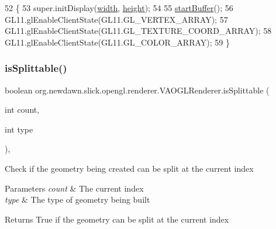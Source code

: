 \begin{DoxyCode}
52                                                    \{
53         super.initDisplay(\mbox{\hyperlink{classorg_1_1newdawn_1_1slick_1_1opengl_1_1renderer_1_1_immediate_mode_o_g_l_renderer_a65d0a04d747368ea954f69074d9102d6}{width}}, \mbox{\hyperlink{classorg_1_1newdawn_1_1slick_1_1opengl_1_1renderer_1_1_immediate_mode_o_g_l_renderer_aec68994a0ee3b7b478122af823c8a8d7}{height}});
54         
55         \mbox{\hyperlink{classorg_1_1newdawn_1_1slick_1_1opengl_1_1renderer_1_1_v_a_o_g_l_renderer_aec6f5ba886a3a750c3cc27527e7b6b6e}{startBuffer}}();
56         GL11.glEnableClientState(GL11.GL\_VERTEX\_ARRAY);
57         GL11.glEnableClientState(GL11.GL\_TEXTURE\_COORD\_ARRAY);
58         GL11.glEnableClientState(GL11.GL\_COLOR\_ARRAY);
59     \}
\end{DoxyCode}
\mbox{\label{classorg_1_1newdawn_1_1slick_1_1opengl_1_1renderer_1_1_v_a_o_g_l_renderer_a680c1bc366d8d8680355f4bae4f332f0}} 
\subsubsection{\texorpdfstring{is\+Splittable()}{isSplittable()}}
{\footnotesize\ttfamily boolean org.\+newdawn.\+slick.\+opengl.\+renderer.\+V\+A\+O\+G\+L\+Renderer.\+is\+Splittable (\begin{DoxyParamCaption}\item[{int}]{count,  }\item[{int}]{type }\end{DoxyParamCaption})\hspace{0.3cm}{\ttfamily [inline]}, {\ttfamily [private]}}

Check if the geometry being created can be split at the current index


\begin{DoxyParams}{Parameters}
{\em count} & The current index \\
\hline
{\em type} & The type of geometry being built \\
\hline
\end{DoxyParams}
\begin{DoxyReturn}{Returns}
True if the geometry can be split at the current index 
\end{DoxyReturn}

